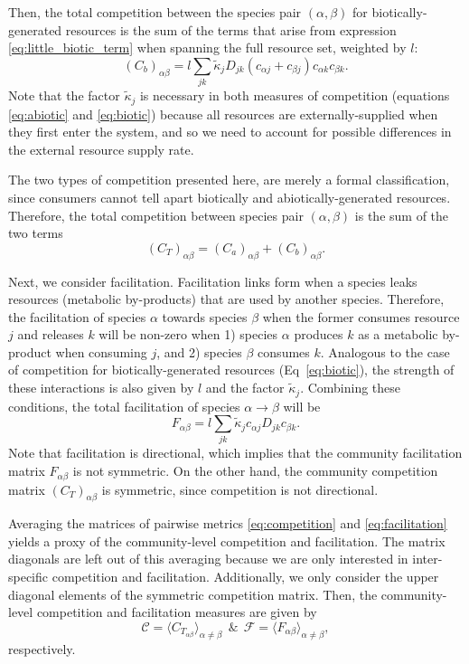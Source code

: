 \documentclass[12pt]{article}
\begin{document}
Then, the total competition between the species pair $(\alpha, \beta)$ for biotically-generated resources is the sum of the terms that arise from expression \ref{eq:little_biotic_term} when spanning the full resource set, weighted by $l$:
\begin{equation}\label{eq:biotic}
	(C_b)_{\alpha\beta} = l \sum_{jk} \tilde{\kappa}_jD_{jk}\left(c_{\alpha j} + c_{\beta j}\right)c_{\alpha k}c_{\beta k}.
\end{equation}
Note that the factor $\tilde{\kappa}_j$ is necessary in both measures of competition (equations \ref{eq:abiotic} and \ref{eq:biotic}) because all  resources are externally-supplied when they first enter the system, and so we need to account for possible differences in the external resource supply rate. 

The two types of competition presented here, are merely a formal classification, since consumers cannot tell apart biotically and abiotically-generated resources. Therefore, the total competition between species pair $(\alpha, \beta)$ is the sum of the two terms
\begin{equation}\label{eq:competition}
    (C_T)_{\alpha \beta} = (C_a)_{\alpha \beta} + (C_b)_{\alpha \beta}.
\end{equation}

Next, we consider facilitation. Facilitation links form when a species leaks resources (metabolic by-products) that are used by another species. Therefore, the facilitation of species $\alpha$ towards species $\beta$ when the former consumes resource $j$ and releases $k$ will be non-zero when 1) species $\alpha$ produces $k$ as a metabolic by-product when consuming $j$, and 2) species $\beta$ consumes $k$. Analogous to the case of competition for biotically-generated resources (Eq~\ref{eq:biotic}), the strength of these interactions is also given by $l$ and the factor $\tilde{\kappa}_j$. Combining these conditions, the total facilitation of species $\alpha\rightarrow \beta$ will be
\begin{equation}\label{eq:facilitation}
    F_{\alpha \beta} = l\sum_{jk} \tilde{\kappa}_jc_{\alpha j}D_{jk}c_{\beta k}.
\end{equation}
Note that facilitation is directional, which implies that the community facilitation matrix $F_{\alpha \beta}$ is not symmetric. On the other hand, the community competition matrix $(C_T)_{\alpha \beta}$ is symmetric, since competition is not directional.  

Averaging the matrices of pairwise metrics \ref{eq:competition} and \ref{eq:facilitation} yields a proxy of the community-level competition and facilitation. The matrix diagonals are left out of this averaging because we are only interested in inter-specific competition and facilitation. Additionally, we only consider the upper diagonal elements of the symmetric competition matrix. Then, the community-level competition and facilitation measures are given by
\begin{equation*}
    \mathcal{C} =  \langle C_{T_{\alpha \beta}} \rangle_{\alpha \neq \beta}~~\&~~\mathcal{F} =  \langle F_{\alpha \beta} \rangle_{\alpha \neq \beta},
\end{equation*}
respectively.
\end{document}
